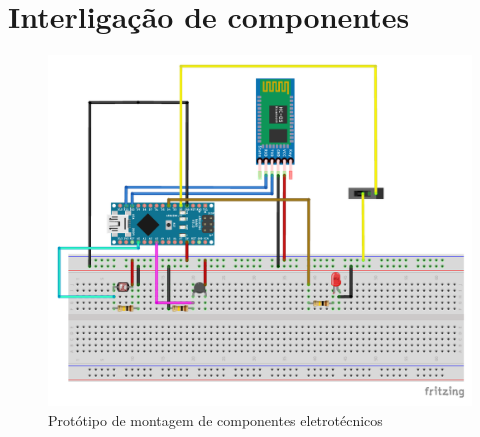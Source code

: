 \chapter{Interligação de componentes}
\label{interlapd}

\begin{figure}[h]
	\centering
	\includegraphics[width=\linewidth]{esquemas/arduino-fritzing/esquema-arduino_bb.pdf}
	\caption{Protótipo de montagem de componentes eletrotécnicos}
	\label{dikw}
\end{figure}